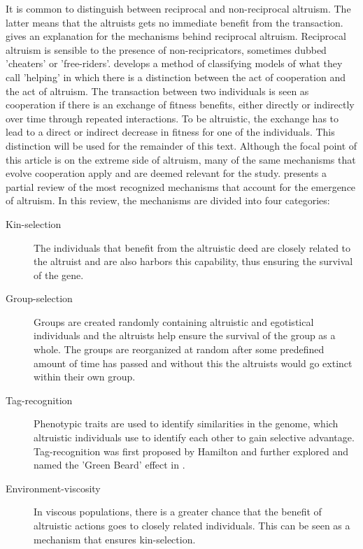 \documentclass[a4paper]{book}
\begin{document}
It is common to distinguish between reciprocal and non-reciprocal altruism. The latter means that the altruists gets no immediate benefit from the transaction.\cite{trivers_evolution_1971} gives an explanation for the mechanisms behind reciprocal altruism.
Reciprocal altruism is sensible to the presence of non-recipricators, sometimes dubbed 'cheaters' or 'free-riders'. 
\cite{lehmann_evolution_2006} develops a method of classifying models of what they call 'helping' in which there is a distinction between the act of cooperation and the act of altruism. 
The transaction between two individuals is seen as cooperation if there is an exchange of fitness benefits, either directly or indirectly over time through repeated interactions. 
To be altruistic, the exchange has to lead to a direct or indirect decrease in fitness for one of the individuals. 
This distinction will be used for the remainder of this text. Although the focal point of this article is on the extreme side of altruism, many of the same mechanisms that evolve cooperation apply and are deemed relevant for the study. 
\cite{montanier_environment-driven_2013} presents a partial review of the most recognized mechanisms that account for the emergence of altruism. In this review, the mechanisms are divided into four categories:
\begin{description}
\item[Kin-selection] {The individuals that benefit from the altruistic deed are closely related to the altruist and are also harbors this capability, thus ensuring the survival of the gene.}
\item[Group-selection] {Groups are created randomly containing altruistic and egotistical individuals and the altruists help ensure the survival of the group as a whole. The groups are reorganized at random after some predefined amount of time has passed and without this the altruists would go extinct within their own group.}
\item[Tag-recognition]{Phenotypic traits are used to identify similarities in the genome, which altruistic individuals use to identify each other to gain selective advantage.
Tag-recognition was first proposed by Hamilton and further explored and named the 'Green Beard' effect in \cite{dawkins_selfish_2006}. 
}
\item[Environment-viscosity] {In viscous populations, there is a greater chance that the benefit of altruistic actions goes to closely related individuals. This can be seen as a mechanism that ensures kin-selection.}
\end{description}
\end{document}

